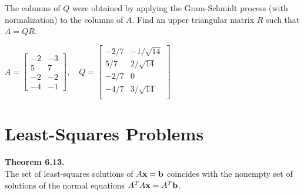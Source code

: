 \begin{exercise} %
	The columns of $Q$ were obtained by applying the Gram-Schmidt process (with normalization) to the columns of $A$. Find an upper triangular matrix $R$ such that $A=QR$.
	
	\vspace{1em}
	$ A= \begin{bmatrix}-2&-3\\5&7\\-2&-2\\-4&-1\end{bmatrix}, \quad
	Q= \begin{bmatrix}-2/7&-1/\sqrt{14}\\5/7&2/\sqrt{14}\\-2/7&0\\-4/7&3/\sqrt{14}\\\end{bmatrix}$
\end{exercise}
\vfill


\newpage


\section{Least-Squares Problems}
\name


\begin{boxthm}
	\textbf{Theorem 6.13.} \\
	The set of least-squares solutions of $A\boldsymbol{\mathbf{x}}=\boldsymbol{\mathbf{b}}$ coincides with the nonempty set of solutions of the normal equations $A^TA\boldsymbol{\mathbf{x}} = A^T\boldsymbol{\mathbf{b}}$.
\end{boxthm}


